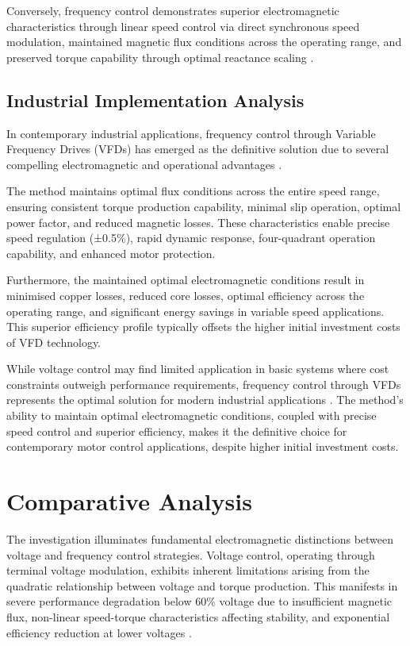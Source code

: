 \documentclass[a4paper,12pt]{IEEEtran}
\begin{document}
Conversely, frequency control demonstrates superior electromagnetic characteristics through linear speed control via direct synchronous speed modulation, maintained magnetic flux conditions across the operating range, and preserved torque capability through optimal reactance scaling \cite{mohan2014}.

\subsection*{Industrial Implementation Analysis}

In contemporary industrial applications, frequency control through Variable Frequency Drives (VFDs) has emerged as the definitive solution due to several compelling electromagnetic and operational advantages \cite{sen2021}.

The method maintains optimal flux conditions across the entire speed range, ensuring consistent torque production capability, minimal slip operation, optimal power factor, and reduced magnetic losses. These characteristics enable precise speed regulation (±0.5\%), rapid dynamic response, four-quadrant operation capability, and enhanced motor protection.

Furthermore, the maintained optimal electromagnetic conditions result in minimised copper losses, reduced core losses, optimal efficiency across the operating range, and significant energy savings in variable speed applications. This superior efficiency profile typically offsets the higher initial investment costs of VFD technology.

While voltage control may find limited application in basic systems where cost constraints outweigh performance requirements, frequency control through VFDs represents the optimal solution for modern industrial applications \cite{chapman2021}. The method's ability to maintain optimal electromagnetic conditions, coupled with precise speed control and superior efficiency, makes it the definitive choice for contemporary motor control applications, despite higher initial investment costs.

\section{Comparative Analysis}
The investigation illuminates fundamental electromagnetic distinctions between voltage and frequency control strategies. Voltage control, operating through terminal voltage modulation, exhibits inherent limitations arising from the quadratic relationship between voltage and torque production. This manifests in severe performance degradation below 60\% voltage due to insufficient magnetic flux, non-linear speed-torque characteristics affecting stability, and exponential efficiency reduction at lower voltages \cite{fitzgerald2020}.
\end{document}
